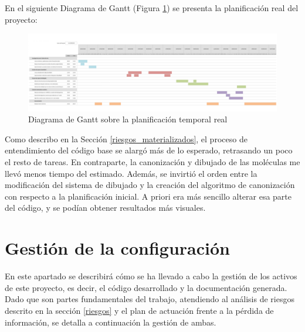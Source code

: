 \begin{landscape}

En el siguiente Diagrama de Gantt (Figura \ref{fig:gantt_real}) se presenta la planificación real del proyecto:

    \begin{figure}[h!]
        \centering
        \includegraphics[scale=0.9]{imagenes/planificacion/planificacion_real.png}
        \caption{Diagrama de Gantt sobre la planificación temporal real}
        \label{fig:gantt_real}
    \end{figure}
\end{landscape}

% 


Como describo en la Sección \ref{riesgos_materializados}, el proceso de entendimiento del código base se alargó más de lo esperado, retrasando un poco el resto de tareas. En contraparte, la canonización y dibujado de las moléculas me llevó menos tiempo del estimado. Además, se invirtió el orden entre la modificación del sistema de dibujado y la creación del algoritmo de canonización con respecto a la planificación inicial. A priori era más sencillo alterar esa parte del código, y se podían obtener resultados más visuales.

\section{Gestión de la configuración}
En este apartado se describirá cómo se ha llevado a cabo la gestión de los activos de este proyecto, es decir, el código desarrollado y la documentación generada. Dado que son partes fundamentales del trabajo, atendiendo al análisis de riesgos descrito en la sección \ref{riesgos} y el plan de actuación frente a la pérdida de información, se detalla a continuación la gestión de ambas.

